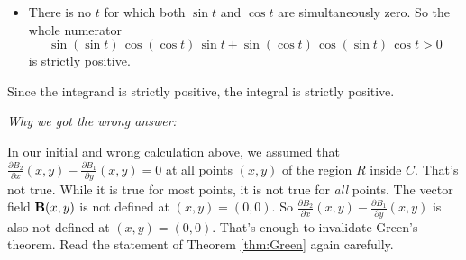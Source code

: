 \begin{eg}
\begin{itemize}
in the numerator,
\begin{equation*}
\cos(\sin t)\,\sin(\cos t)\,\cos t\ge 0
\end{equation*}
and is zero
if and only if $\cos t=0$. 
\item[$\circ$]
There is no $t$ for which both $\sin t$ and $\cos t$ are simultaneously
zero. So the whole numerator 
\begin{equation*}
\sin(\sin t)\,\cos(\cos t)\,\sin t
                  +\sin(\cos t)\,\cos(\sin t)\,\cos t>0
\end{equation*}
is strictly positive.
\end{itemize}
Since the integrand is strictly positive, the integral is strictly positive.

\medskip
\noindent
\emph{Why we got the wrong answer:}

\noindent
In our initial and wrong calculation above, we assumed that 
$\frac{\partial B_2}{\partial x}(x,y) 
                - \frac{\partial B_1}{\partial y}(x,y)=0$
at all points $(x,y)$ of the region $R$ inside $C$. That's not true.
While it is true for most points, it is not true for  \emph{all} points.
The vector field $\mathbf{B}(x,y)$ is not defined at $(x,y)=(0,0)$.
So $\frac{\partial B_2}{\partial x}(x,y) 
                - \frac{\partial B_1}{\partial y}(x,y)$
is also not defined at $(x,y)=(0,0)$. That's enough to invalidate
Green's theorem. Read the statement of Theorem \ref{thm:Green} again carefully.

\end{eg}

